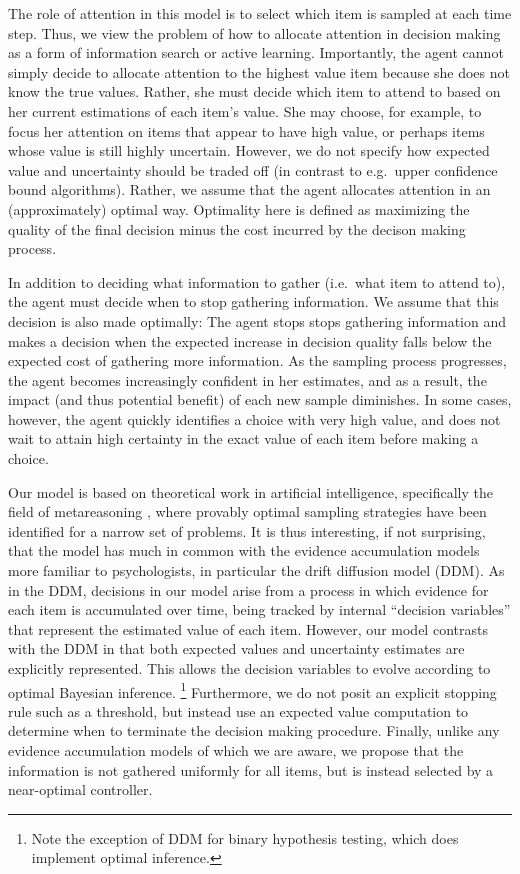\documentclass[12pt,a4paperpaper,]{article}
\begin{document}
The role of attention in this model is to select which item is sampled at each time step. Thus, we view the problem of how to allocate attention in decision making as a form of information search or active learning. Importantly, the agent cannot simply decide to allocate attention to the highest value item because she does not know the true values. Rather, she must decide which item to attend to based on her current estimations of each item's value. She may choose, for example, to focus her attention on items that appear to have high value, or perhaps items whose value is still highly uncertain. However, we do not specify how expected value and uncertainty should be traded off (in contrast to e.g.~upper confidence bound algorithms). Rather, we assume that the agent allocates attention in an (approximately) optimal way. Optimality here is defined as maximizing the quality of the final decision minus the cost incurred by the decison making process.

In addition to deciding what information to gather (i.e.~what item to attend to), the agent must decide when to stop gathering information. We assume that this decision is also made optimally: The agent stops stops gathering information and makes a decision when the expected increase in decision quality falls below the expected cost of gathering more information. As the sampling process progresses, the agent becomes increasingly confident in her estimates, and as a result, the impact (and thus potential benefit) of each new sample diminishes. In some cases, however, the agent quickly identifies a choice with very high value, and does not wait to attain high certainty in the exact value of each item before making a choice.

Our model is based on theoretical work in artificial intelligence, specifically the field of metareasoning \citep{Hay2012}, where provably optimal sampling strategies have been identified for a narrow set of problems. It is thus interesting, if not surprising, that the model has much in common with the evidence accumulation models more familiar to psychologists, in particular the drift diffusion model (DDM). As in the DDM, decisions in our model arise from a process in which evidence for each item is accumulated over time, being tracked by internal ``decision variables'' that represent the estimated value of each item. However, our model contrasts with the DDM in that both expected values and uncertainty estimates are explicitly represented. This allows the decision variables to evolve according to optimal Bayesian inference.%
  \footnote{Note the exception of DDM for binary hypothesis testing, which does implement optimal inference.}
Furthermore, we do not posit an explicit stopping rule such as a threshold, but instead use an expected value computation to determine when to terminate the decision making procedure. Finally, unlike any evidence accumulation models of which we are aware, we propose that the information is not gathered uniformly for all items, but is instead selected by a near-optimal controller.
\end{document}
